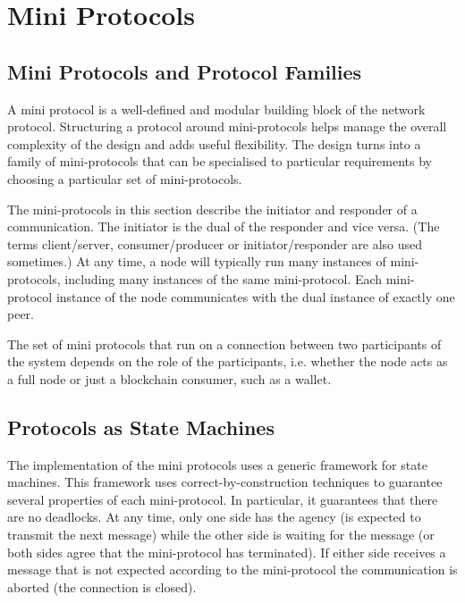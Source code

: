 \chapter{Mini Protocols}
\label{chapter:mini-protocols}

\newcommand{\Client}{\textcolor{mygreen}{\textbf{Client}}}
\newcommand{\Server}{\textcolor{myblue}{\textbf{Server}}}

\section{Mini Protocols and Protocol Families}
A mini protocol is a well-defined and modular building block of
the network protocol.
Structuring a protocol around mini-protocols helps manage the overall complexity of
the design and adds useful flexibility.
The design turns into a family of mini-protocols that can be specialised to particular requirements
by choosing a particular set of mini-protocols.

The mini-protocols in this section describe the initiator and responder of a communication.
The initiator is the dual of the responder and vice versa.
(The terms client/server, consumer/producer or initiator/responder are also used sometimes.)
At any time, a node will typically run many instances of mini-protocols, including many instances of the
same mini-protocol.
Each mini-protocol instance of the node communicates with the dual instance of
exactly one peer.

The set of mini protocols that run on a connection between two participants of the system
depends on the role of the participants, i.e. whether the node acts as a full node or just
a blockchain consumer, such as a wallet.

\section{Protocols as State Machines}
The implementation of the mini protocols uses a generic framework for state machines.
This framework uses correct-by-construction techniques to guarantee
several properties of each mini-protocol.
In particular, it guarantees that there are no deadlocks.
At any time, only one side has the agency
(is expected to transmit the next message) while the other side is waiting for
the message (or both sides agree that the mini-protocol has terminated).
If either side receives a message that is not expected according to the mini-protocol
the communication is aborted (the connection is closed).

